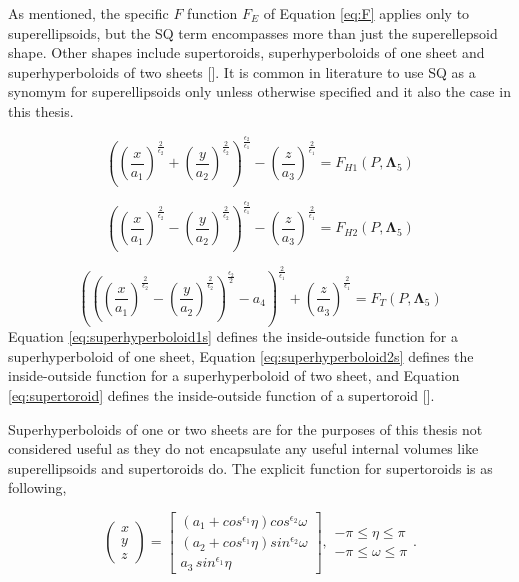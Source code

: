 As mentioned, the specific $F$ function $F_E$ of Equation \ref{eq:F} applies only to superellipsoids, but the \gls{SQ} term encompasses more than just the superellepsoid shape. Other shapes include supertoroids, superhyperboloids of one sheet and superhyperboloids of two sheets [\citeauthor{Jaklic2000}]. It is common in literature to use \gls{SQ} as a synomym for superellipsoids only unless otherwise specified and it also the case in this thesis.

\begin{equation}\label{eq:superhyperboloid1s}
\left(\left(\frac{x}{a_1}\right)^{\frac{2}{\epsilon_2}} + \left(\frac{y}{a_2}\right)^{\frac{2}{\epsilon_2}} \right)^{\frac{\epsilon_2}{\epsilon_1}} - \left(\frac{z}{a_3}\right)^{\frac{2}{\epsilon_1}} = F_{H1}(P,\mathbf{\Lambda}_5)
\end{equation} 

\begin{equation}\label{eq:superhyperboloid2s}
\left(\left(\frac{x}{a_1}\right)^{\frac{2}{\epsilon_2}} - \left(\frac{y}{a_2}\right)^{\frac{2}{\epsilon_2}} \right)^{\frac{\epsilon_2}{\epsilon_1}} - \left(\frac{z}{a_3}\right)^{\frac{2}{\epsilon_1}} = F_{H2}(P,\mathbf{\Lambda}_5)
\end{equation} 

\begin{equation}\label{eq:supertoroid}
\left(\left(\left(\frac{x}{a_1}\right)^{\frac{2}{\epsilon_2}} - \left(\frac{y}{a_2}\right)^{\frac{2}{\epsilon_2}} \right)^{\frac{\epsilon_2}{2}} - a_4 \right)^{\frac{2}{\epsilon_1}} + \left(\frac{z}{a_3}\right)^{\frac{2}{\epsilon_1}} = F_{T}(P,\mathbf{\Lambda}_5)
\end{equation} 
Equation \ref{eq:superhyperboloid1s} defines the inside-outside function for a superhyperboloid of one sheet, Equation \ref{eq:superhyperboloid2s} defines the inside-outside function for a superhyperboloid of two sheet, and Equation \ref{eq:supertoroid} defines the inside-outside function of a supertoroid [\citeauthor{H.Barr1981}].


Superhyperboloids of one or two sheets are for the purposes of this thesis not considered useful as they do not encapsulate any useful internal volumes like superellipsoids and supertoroids do. The explicit function for supertoroids is as following,

\begin{equation}
\begin{pmatrix}
x \\ y \\ z
\end{pmatrix} = \begin{bmatrix}
(a_1 + cos^{\epsilon_1}\eta)cos^{\epsilon_2}\omega \\
(a_2 + cos^{\epsilon_1}\eta)sin^{\epsilon_2}\omega \\
a_3\,sin^{\epsilon_1}\eta
\end{bmatrix}, \begin{matrix}
-\pi \leq \eta \leq \pi \\
-\pi \leq \omega \leq \pi
\end{matrix}.
\label{eq:SQToroid}
\end{equation}

